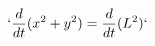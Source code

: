 \documentclass[preview]{standalone}
\begin{document}
\begin{align*}
`\frac{d}{dt}(x^2 + y^2) = \frac{d}{dt}(L^2)`
\end{align*}
\end{document}
